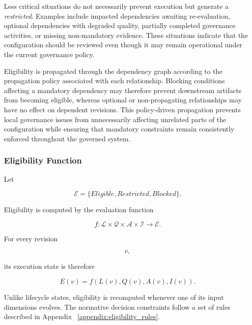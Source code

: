 \documentclass[10pt]{article}
\begin{document}
Less critical situations do not necessarily prevent execution but generate a \textit{restricted}. Examples include impacted dependencies awaiting re-evaluation, optional dependencies with degraded quality, partially completed governance activities, or missing non-mandatory evidence. These situations indicate that the configuration should be reviewed even though it may remain operational under the current governance policy.

Eligibility is propagated through the dependency graph according to the propagation policy associated with each relationship. Blocking conditions affecting a mandatory dependency may therefore prevent downstream artifacts from becoming eligible, whereas optional or non-propagating relationships may have no effect on dependent revisions. This policy-driven propagation prevents local governance issues from unnecessarily affecting unrelated parts of the configuration while ensuring that mandatory constraints remain consistently enforced throughout the governed system.

\subsubsection{Eligibility Function}

Let

\begin{equation}
\mathcal{E}
=
\{
Eligible,
Restricted,
Blocked
\}.
\label{eq:eligibility_state}
\end{equation}

Eligibility is computed by the evaluation function

\begin{equation}
f
:
\mathcal{L}
\times
\mathcal{Q}
\times
\mathcal{A}
\times
\mathcal{I}
\rightarrow
\mathcal{E}.
\label{eq:eligibility_function}
\end{equation}

For every revision

\[
v,
\]

its execution state is therefore

\begin{equation}
E(v)
=
f
(
L(v),
Q(v),
A(v),
I(v)
).
\label{eq:eligibility_execution_state}
\end{equation}

Unlike lifecycle states, eligibility is recomputed whenever one of its input
dimensions evolves. The normative decision constraints follow a set of rules described in Appendix ~\ref{appendix:eligibility_rules}.
\end{document}
